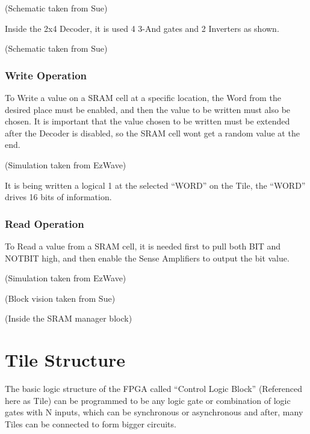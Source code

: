 \documentclass[letterpaper,10pt,english]{sphinxmanual}
\begin{document}
\noindent{}

(Schematic taken from Sue)

Inside the 2x4 Decoder, it is used 4 3-And gates and 2 Inverters as shown.

\noindent{}

(Schematic taken from Sue)


\subsection{Write Operation}
\label{writeoperation::doc}\label{writeoperation:write-operation}
To Write a value on a SRAM cell at a specific location, the Word from the desired place must be enabled, and then the value to be written must also be chosen. It is important that the value chosen to be written must be extended after the Decoder is disabled, so the SRAM cell wont get a random value at the end.

\noindent{}

(Simulation taken from EzWave)

It is being written a logical 1 at the selected ``WORD'' on the Tile, the ``WORD'' drives 16 bits of information.


\subsection{Read Operation}
\label{readoperation::doc}\label{readoperation:read-operation}
To Read a value from a SRAM cell, it is needed first to pull both BIT and NOTBIT high, and then enable the Sense Amplifiers to output the bit value.

\noindent{}

(Simulation taken from EzWave)

\noindent{}

(Block vision taken from Sue)

\noindent{}

(Inside the SRAM manager block)


\chapter{Tile Structure}
\label{index:tile-structure}
The basic logic structure of the FPGA called ``Control Logic Block'' (Referenced here as Tile) can be programmed to be any logic gate or combination of logic gates with N inputs, which can be synchronous or asynchronous and after, many Tiles can be connected to form bigger circuits.
\end{document}
